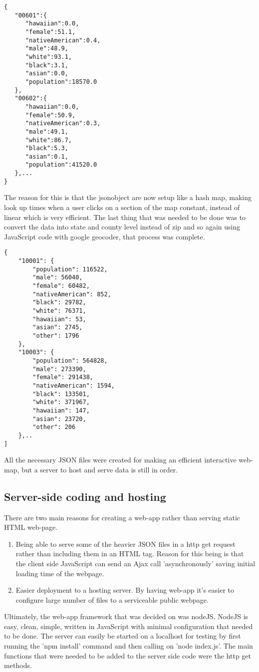 \documentclass[twoside]{article}
\begin{document}
\begin{multicols}{2}
\begin{verbatim}
{  
   "00601":{  
      "hawaiian":0.0,
      "female":51.1,
      "nativeAmerican":0.4,
      "male":48.9,
      "white":93.1,
      "black":3.1,
      "asian":0.0,
      "population":18570.0
   },
   "00602":{  
      "hawaiian":0.0,
      "female":50.9,
      "nativeAmerican":0.3,
      "male":49.1,
      "white":86.7,
      "black":5.3,
      "asian":0.1,
      "population":41520.0
   },...
}
\end{verbatim}
The reason for this is that the jsonobject are now setup like a hash map, making look up times when a user clicks on a section of the map constant, instead of linear which is very efficient. 
The last thing that was needed to be done was to convert the data into state and county level instead of zip and so again using JavaScript code with google geocoder, that process was complete. 

\begin{verbatim}
{
    "10001": {
        "population": 116522,
        "male": 56040,
        "female": 60482,
        "nativeAmerican": 852,
        "black": 29782,
        "white": 76371,
        "hawaiian": 53,
        "asian": 2745,
        "other": 1796
    },
    "10003": {
        "population": 564828,
        "male": 273390,
        "female": 291438,
        "nativeAmerican": 1594,
        "black": 133501,
        "white": 371967,
        "hawaiian": 147,
        "asian": 23720,
        "other": 206
    },..
]
\end{verbatim}
All the necessary JSON files were created for making an efficient interactive web-map, but a server to host and serve data is still in order. 
\subsection{Server-side coding and hosting}
There are two main reasons for creating a web-app rather than serving static HTML web-page. 

\begin{enumerate}
  \item Being able to serve some of the heavier JSON files in a http get request rather than including them in an HTML tag. Reason for this being is that the client side JavaScript can send an Ajax call 'asynchronously' saving initial loading time of the webpage. 
  \item Easier deployment to a hosting server. By having web-app it’s easier to configure large number of files to a serviceable public webpage.
\end{enumerate}
Ultimately, the web-app framework that was decided on was nodeJS.  NodeJS is easy, clean, simple, written in JavaScript with minimal configuration that needed to be done. The server can easily be started on a localhost for testing by first running the 'npm install' command and then calling on 'node index.js'. The main functions that were needed to be added to the server side code were the http get methods.


\end{multicols}
\end{document}
